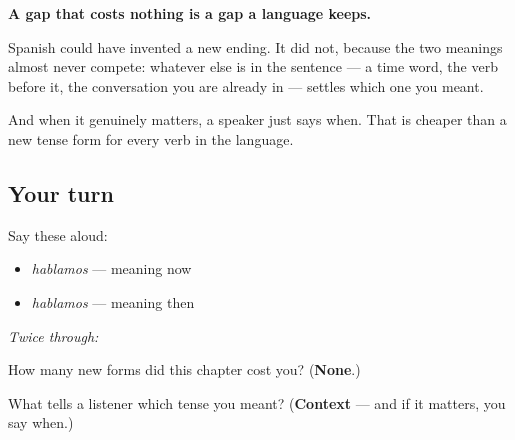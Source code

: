 \begin{culture}
\textbf{A gap that costs nothing is a gap a language keeps.}

Spanish could have invented a new ending. It did not, because the two meanings almost never compete: whatever else is in the sentence — a time word, the verb before it, the conversation you are already in — settles which one you meant.

And when it genuinely matters, a speaker just says when. That is cheaper than a new tense form for every verb in the language.
\end{culture}

\subsection*{Your turn}
Say these aloud:

\begin{itemize}
\raggedright
  \item \emph{hablamos} — meaning now
  \item \emph{hablamos} — meaning then
\end{itemize}

\emph{Twice through:}

\begin{tcolorbox}[breakable,colback=teal!4,colframe=teal!35!black,title={Before you move on}]
How many new forms did this chapter cost you? (\textbf{None}.)

What tells a listener which tense you meant? (\textbf{Context} — and if it matters, you say when.)
\end{tcolorbox}

